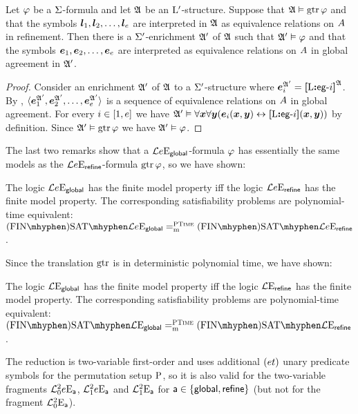 \begin{remark}\label{rem:global-m-to-e}
Let $\varphi$ be a $\mathrm{\Sigma}$-formula and let $\mathfrak{A}$ be an ${{\mathrm{L}}'}$-structure.
Suppose that $\mathfrak{A} \vDash \operatorname{gtr}\varphi$ and that the symbols
$\bm{l}_{1},\bm{l}_{2},\dots,\bm{l}_{e}$ are interpreted in $\mathfrak{A}$ as equivalence
relations on $A$ in refinement.
Then there is a $\mathrm{\Sigma'}$-enrichment $\mathfrak{A'}$ of $\mathfrak{A}$ such that
$\mathfrak{A'} \vDash \varphi$ and that the symbols $\bm{e}_{1},\bm{e}_{2},\dots,\bm{e}_{e}$ are
interpreted as equivalence relations on $A$ in global agreement in $\mathfrak{A'}$.
\end{remark}
\begin{proof}
Consider an enrichment $\mathfrak{A'}$ of $\mathfrak{A}$ to a $\mathrm{\Sigma'}$-structure
where $\bm{e}_{i}^{\mathfrak{A'}} = {\bm{[}{\mathrm{L}}\mathord{\bm{:}}\mathsf{eg}{\hbox{-}}i\bm{]}}^{\mathfrak{A}}$.
By ,
$\langle \bm{e}_{1}^{\mathfrak{A'}}, \bm{e}_{2}^{\mathfrak{A'}}, \dots, \bm{e}_{e}^{\mathfrak{A'}} \rangle$
is a sequence of equivalence relations on $A$ in global agreement.
For every $i \in [1,e]$ we have 
$\mathfrak{A'} \vDash \forall\bm{x}\forall\bm{y}(\bm{e}_{i}(\bm{x},\bm{y}) \leftrightarrow
{\bm{[}{\mathrm{L}}\mathord{\bm{:}}\mathsf{eg}{\hbox{-}}i\bm{]}}(\bm{x},\bm{y}))$ by definition.
Since $\mathfrak{A'} \vDash \operatorname{gtr}\varphi$ we have $\mathfrak{A'} \vDash \varphi$.
\end{proof}

The last two remarks show that a $\mathcal{L}{e}\mathrm{E}_{\mathsf{global}}$-formula $\varphi$
has essentially the same models as the $\mathcal{L}{e}\mathrm{E}_{\mathsf{refine}}$-formula
$\operatorname{gtr}\varphi$, so we have shown:
\begin{proposition}\label{prop:global-to-refine-n}
The logic $\mathcal{L}{e}\mathrm{E}_{\mathsf{global}}$ has the finite model property iff
the logic $\mathcal{L}{e}\mathrm{E}_{\mathsf{refine}}$ has the finite model property. 
The corresponding satisfiability problems are polynomial-time equivalent:
$\FinASat{\Fo\Eea\sze\agglobal} \redeq\cP \FinASat{\Fo\Eea\sze\agrefine}$.
\end{proposition}

Since the translation $\operatorname{gtr}$ is in deterministic polynomial time, we have shown:
\begin{proposition}\label{prop:global-to-refine}
The logic $\mathcal{L}{{}}\mathrm{E}_{\mathsf{global}}$ has the finite model property iff
the logic $\mathcal{L}{{}}\mathrm{E}_{\mathsf{refine}}$ has the finite model property. 
The corresponding satisfiability problems are polynomial-time equivalent:
$\FinASat{\Fo\Eea\nosze\agglobal} \redeq\cP \FinASat{\Fo\Eea\nosze\agrefine}$.
\end{proposition}

The reduction is two-variable first-order and uses additional $(et)$
unary predicate symbols for the permutation setup ${\mathrm{P}}$, so it is also valid
for the two-variable fragments $\mathcal{L}^{2}_{0}{e}\mathrm{E}_{\mathsf{a}}$, $\mathcal{L}^{2}_{1}{e}\mathrm{E}_{\mathsf{a}}$
and $\mathcal{L}^{2}_{1}{{}}\mathrm{E}_{\mathsf{a}}$ for $\mathsf{a} \in \left\{\mathsf{global}, \mathsf{refine}\right\}$ (but not
for the fragment $\mathcal{L}^{2}_{0}{{}}\mathrm{E}_{\mathsf{a}}$).
